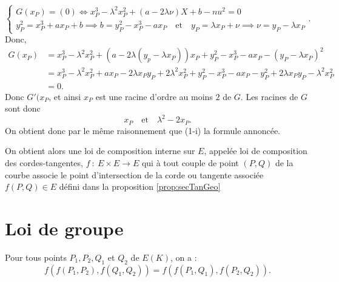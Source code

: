 \begin{demonstration}
\begin{description}
\begin{description}
\[\begin{cases}
                G(x_P)=(0) \iff x_P^3-\lambda^2x_P^2+\left( a-2\lambda\nu \right)X+b-nu^2=0 \\
                y_P^2=x_P^3+ax_P+b \implies b=y_P^2-x_P^3-ax_P \quad \text{et} \quad y_P=\lambda x_P + \nu \implies \nu = y_P - \lambda x_P
                    \end{cases}
                .\] 
                Donc,
                \begin{align*}
                    G(x_P) &=x_P^3-\lambda^2x_P^2+\left( a-2\lambda\left( y_p-\lambda x_P \right)  \right) x_P + y_P^2-x_P^3-ax_P-\left( y_P -\lambda x_P \right) ^2\\
                    &= x_P^3-\lambda^2 x_P^2+ax_P-2\lambda x_Py_P+2\lambda^2x_P^2+y_P^2-x_P^3-ax_P-y_P^2+2\lambda x_Py_P -\lambda^2x_P^2 \\
                    &= 0 
                .\end{align*}
                Donc $G'(x_{P}$, et ainsi $x_P$ est une racine d'ordre au moins $2$ de $G$. Les racines de $G$ sont donc 
\[
x_P \quad \text{et} \quad \lambda^2-2x_P
.\] 
On obtient donc par le même raisonnement que (1-i) la formule annoncée.
        \end{description}
    \end{description}
\end{demonstration}

On obtient alors une loi de composition interne sur $E$, appelée loi de composition des
cordes-tangentes, $f\ :\ E\times E \to E$ qui à tout couple de point $(P,Q)$ de la courbe
associe le point d'intersection de la corde ou tangente associée $f(P,Q) \in E$ défini
dans la proposition \ref{prop:secTanGeo} 

\section{Loi de groupe}


\begin{proposition}[admis]
    \label{prop:propasso}
    
    Pour tous points $P_1,P_2,Q_1$ et $Q_2$ de $E(K)$, on a :
    \[
    f(f(P_1,P_2),f(Q_1,Q_2)) = f(f(P_1,Q_1),f(P_2,Q_2))
    .\] 
\end{proposition}

